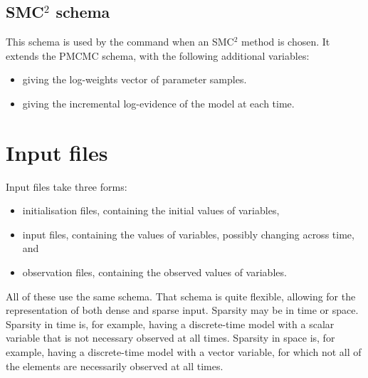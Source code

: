 \subsection{SMC$^2$ schema}

This schema is used by the  command when an SMC$^2$ method
is chosen. It extends the PMCMC schema, with the following additional
variables:
\begin{itemize}
\item {} giving the log-weights vector of parameter samples.
\item {} giving the incremental log-evidence of the model
  at each time.
\end{itemize}

\section{Input files\label{Input_files}}

Input files take three forms:
\begin{itemize}
\item initialisation files, containing the initial values of 
  variables,
\item input files, containing the values of  variables, possibly
  changing across time, and
\item observation files, containing the observed values of 
  variables.
\end{itemize}
All of these use the same schema. That schema is quite flexible, allowing for
the representation of both dense and sparse input. Sparsity may be in time or
space. Sparsity in time is, for example, having a discrete-time model with a
scalar  variable that is not necessary observed at all
times. Sparsity in space is, for example, having a discrete-time model with a
vector  variable, for which not all of the elements are necessarily
observed at all times.

